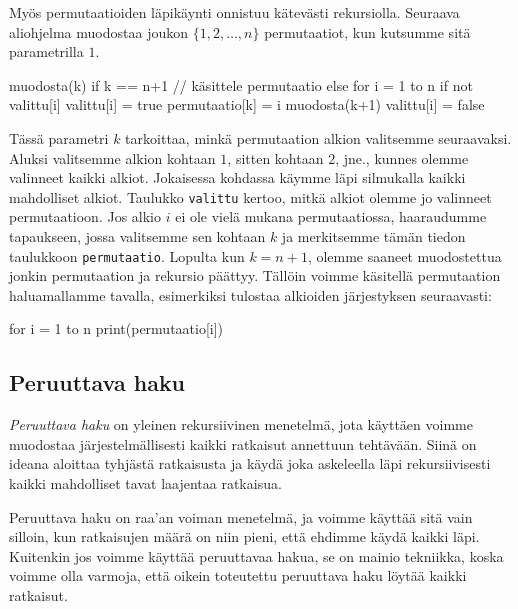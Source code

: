 Myös permutaatioiden läpikäynti onnistuu kätevästi rekursiolla.
Seuraava aliohjelma muodostaa joukon $\{1,2,\dots,n\}$ permutaatiot,
kun kutsumme sitä parametrilla $1$.

\begin{code}
muodosta(k)
    if k == n+1
        // käsittele permutaatio
    else
        for i = 1 to n
            if not valittu[i]
                valittu[i] = true
                permutaatio[k] = i
                muodosta(k+1)
                valittu[i] = false
\end{code}

Tässä parametri $k$ tarkoittaa, minkä permutaation alkion valitsemme
seuraavaksi.
Aluksi valitsemme alkion kohtaan $1$, sitten kohtaan $2$,
jne., kunnes olemme valinneet kaikki alkiot.
Jokaisessa kohdassa käymme läpi silmukalla kaikki mahdolliset alkiot.
Taulukko \texttt{valittu} kertoo, mitkä alkiot olemme jo valinneet
permutaatioon.
Jos alkio $i$ ei ole vielä mukana permutaatiossa, haaraudumme tapaukseen,
jossa valitsemme sen kohtaan $k$ ja merkitsemme tämän tiedon
taulukkoon \texttt{permutaatio}.
Lopulta kun $k=n+1$, olemme saaneet muodostettua jonkin permutaation
ja rekursio päättyy.
Tällöin voimme käsitellä permutaation haluamallamme tavalla,
esimerkiksi tulostaa alkioiden järjestyksen seuraavasti:

\begin{code}
for i = 1 to n
    print(permutaatio[i])
\end{code}

\subsection{Peruuttava haku}

\emph{Peruuttava haku} on yleinen rekursiivinen  menetelmä,
jota käyttäen voimme muodostaa järjestelmällisesti
kaikki ratkaisut annettuun tehtävään.
Siinä on ideana aloittaa tyhjästä ratkaisusta ja käydä
joka askeleella läpi rekursiivisesti kaikki mahdolliset tavat laajentaa ratkaisua.

Peruuttava haku on raa'an voiman menetelmä,
ja voimme käyttää sitä vain silloin,
kun ratkaisujen määrä on niin pieni,
että ehdimme käydä kaikki läpi.
Kuitenkin jos voimme käyttää peruuttavaa hakua,
se on mainio tekniikka,
koska voimme olla varmoja, että oikein toteutettu
peruuttava haku löytää kaikki ratkaisut.

